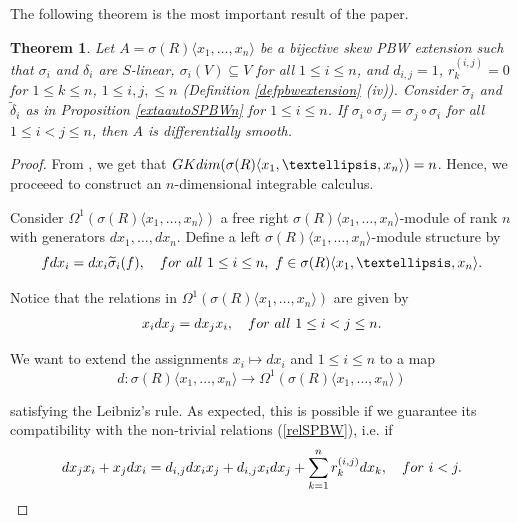 \documentclass{amsart}
\newtheorem{theorem}{Theorem}[section]
\theoremstyle{definition}
\theoremstyle{remark}
\numberwithin{equation}{section}
\begin{document}
The following theorem is the most important result of the paper.

\begin{theorem}\label{smoothSPBWn}
Let $A = \sigma(R)\langle x_1,\ldots, x_n \rangle$ be a bijective skew PBW extension such that $\sigma_i$ and $\delta_i$ are $S$-linear, $\sigma_i(V)\subseteq V$ for all $1\leq i \leq n$, and $d_{i,j}=1$, $r_k^{(i,j)}=0$ for $1\leq k\leq n$, $1\leq i,j, \leq n$ {\rm (}Definition \ref{defpbwextension} {\rm (}iv{\rm )}{\rm )}. Consider $\widetilde{\sigma}_i$ and $\widetilde{\delta}_i$ as in Proposition \ref{extaautoSPBWn} for $1\leq i \leq n$. If $\sigma_i \circ \sigma_j = \sigma_j \circ \sigma_i$ for all $1\leq i < j \leq n$, then $A$ is differentially smooth.
\end{theorem}
\begin{proof}
From \cite[Theorem 2.1]{LezamaVenegas2020}, we get that ${\rm GKdim}(\sigma(R)\langle x_1,\ldots, x_n\rangle) = n$. Hence, we proceeed to construct an $n$-dimensional integrable calculus. 

Consider $\Omega^{1}(\sigma(R)\langle x_1,\ldots, x_n\rangle)$ a free right $\sigma(R)\langle x_1,\ldots, x_n\rangle$-module of rank $n$ with generators $dx_1, \ldots, dx_n$. Define a left $\sigma(R)\langle x_1,\ldots, x_n\rangle$-module structure by
    \begin{equation}\label{relrightmodn}
        f dx_i = dx_i\widetilde{\sigma}_{i}(f),  \quad {\rm for\ all}\ 1\leq i \leq n, \  f\in \sigma(R)\langle x_1,\ldots, x_n\rangle.
    \end{equation}

Notice that the relations in $\Omega^{1}(\sigma(R)\langle x_1,\ldots, x_n\rangle)$ are given by
    \begin{align}\label{reltdt}
        x_idx_j =  dx_jx_i, \quad {\rm for\ all}\ 1\leq i < j \leq n.     
    \end{align}

We want to extend the assignments $x_i\mapsto dx_i$ and $1\leq i \leq n$ to a map 
$$
d: \sigma(R)\langle x_1,\ldots, x_n\rangle \to \Omega^{1}(\sigma(R)\langle x_1,\ldots, x_n\rangle)
$$

satisfying the Leibniz's rule. As expected, this is possible if we guarantee its compatibility with the non-trivial relations {\rm (}\ref{relSPBW}{\rm )}, i.e. if
    \begin{align*}
        dx_jx_i+x_jdx_i = d_{i,j}dx_ix_j+d_{i,j}x_idx_j +\sum_{k=1}^{n}r_{k}^{(i,j)}dx_k, \quad {\rm for}\ i < j.
    \end{align*}


\end{proof}
\end{document}
